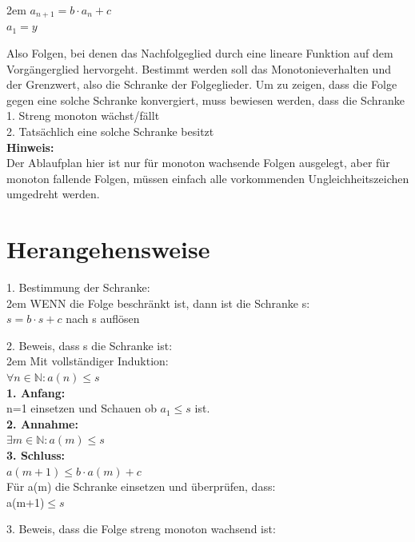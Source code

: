 \documentclass[11pt,final]{scrreprt}
\newcommand{\br} {\medskip\\}
\newcommand{\N} {\mathbb N}
\begin{document}
\begingroup
\leftskip2em 
$ a_{n+1} = b \cdot a_n + c $\\
$ a_1 = y $\\
\par	
\endgroup 

Also Folgen, bei denen das Nachfolgeglied durch eine lineare Funktion auf dem Vorgängerglied hervorgeht. Bestimmt werden soll das Monotonieverhalten und der Grenzwert, also die Schranke der Folgeglieder. Um zu zeigen, dass die Folge gegen eine solche Schranke konvergiert, muss bewiesen werden, dass die Schranke\\
1. Streng monoton wächst/fällt\\
2. Tatsächlich eine solche Schranke besitzt\br
\textbf{Hinweis:}\\
Der Ablaufplan hier ist nur für monoton wachsende Folgen ausgelegt, aber für monoton fallende Folgen, müssen einfach alle vorkommenden Ungleichheitszeichen umgedreht werden.\\

\newpage
\section{Herangehensweise}

1. Bestimmung der Schranke:	\\
		
\begingroup
\leftskip2em 
WENN die Folge beschränkt ist, dann ist die Schranke s:\\
$ s = b \cdot s + c$ nach s auflösen\\
\par	
\endgroup 

2. Beweis, dass s die Schranke ist:\\

\begingroup
\leftskip2em 
Mit vollständiger Induktion:\\
$ \forall n\in\N\colon a(n)\leq s $\br
\textbf{1. Anfang:}\\
n=1 einsetzen und Schauen ob $a_1 \leq s$ ist.\br
\textbf{2. Annahme:}\\
$ \exists m\in\N\colon a(m)\leq s $\br
\textbf{3. Schluss:}\\
$ a(m+1) \leq b\cdot a(m) + c $\\
Für a(m) die Schranke einsetzen und überprüfen, dass:\\
a(m+1)$\leq s$\\
\par	
\endgroup 

3. Beweis, dass die Folge streng monoton wachsend ist:\\
\end{document}
